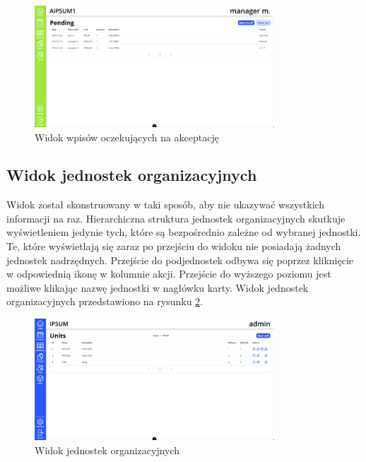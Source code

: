 \begin{figure}[H]
    \centering
    \includegraphics[width=0.8\textwidth, frame]{graf/front/timesheetManagerPending.png}
    \caption{Widok wpisów oczekujących na akceptację}
    \label{fig:timesheetApprovalView}
\end{figure}


\subsection{Widok jednostek organizacyjnych}

Widok został skonstruowany w taki sposób, aby nie ukazywać wszystkich informacji na raz. Hierarchiczna struktura jednostek organizacyjnych skutkuje wyświetleniem jedynie tych, które są bezpośrednio zależne od wybranej jednostki. Te, które wyświetlają się zaraz po przejściu do widoku nie posiadają żadnych jednostek nadrzędnych. Przejście do podjednostek odbywa się poprzez kliknięcie w odpowiednią ikonę w kolumnie akcji. Przejście do wyższego poziomu jest możliwe klikając nazwę jednostki w nagłówku karty. Widok jednostek organizacyjnych przedstawiono na rysunku \ref{fig:unitsView}.

\begin{figure}[H]
    \centering
    \includegraphics[width=0.8\textwidth, frame]{graf/front/units.png}
    \caption{Widok jednostek organizacyjnych}
    \label{fig:unitsView}
\end{figure}

